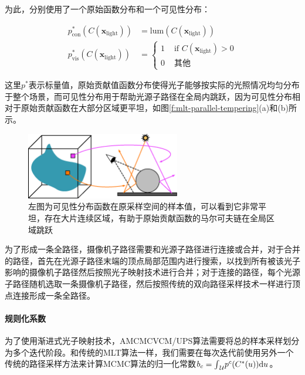 为此，\cite{a:RobustLightTransportSimulationviaMetropolisedBidirectionalEstimators}分别使用了一个原始函数分布和一个可见性分布：

\begin{equation}
\begin{aligned}
	p^{*}_\text{con}(C({\mathbf{x}}_{\text{light}}))&=\text{lum}(C({\mathbf{x}}_{\text{light}}))\\
	p^{*}_\text{vis}(C({\mathbf{x}}_{\text{light}}))&=\begin{cases}
		1 & \text{ if }C({\mathbf{x}}_{\text{light}})>0\\
		0 & \text{ 其他}
	\end{cases}
\end{aligned}
\end{equation}

\noindent 这里$p^{*}$表示标量值，原始贡献值函数分布使得光子能够按实际的光照情况均匀分布于整个场景，而可见性分布用于帮助光源子路径在全局内跳跃，因为可见性分布相对于原始贡献函数在大部分区域更平坦，如图\ref{f:mlt-parallel-tempering}(a)和(b)所示。

\begin{figure}
\sidecaption
\includegraphics[width=0.6\textwidth]{figures/mlt/visibility-contribution}
\caption{左图为可见性分布函数在原采样空间的样本值，可以看到它非常平坦，存在大片连续区域，有助于原始贡献函数的马尔可夫链在全局区域跳跃}
\label{f:mlt-visibility-contribution}
\end{figure}

为了形成一条全路径，摄像机子路径需要和光源子路径进行连接或合并，对于合并的路径，首先在光源子路径末端的顶点局部范围内进行搜索，以找到所有被该光子影响的摄像机子路径然后按照光子映射技术进行合并；对于连接的路径，每个光源子路径随机选取一条摄像机子路径，然后按照传统的双向路径采样技术一样进行顶点连接形成一条全路径。




\paragraph{规则化系数}
为了使用渐进式光子映射技术，AMCMCVCM/UPS算法需要将总的样本采样划分为多个迭代阶段。和传统的MLT算法一样，我们需要在每次迭代前使用另外一个传统的路径采样方法来计算MCMC算法的归一化常数$b_c={\rm \int}_{\mathcal{U}}p^{c}(C^{*}(u)){\rm d}u$。


